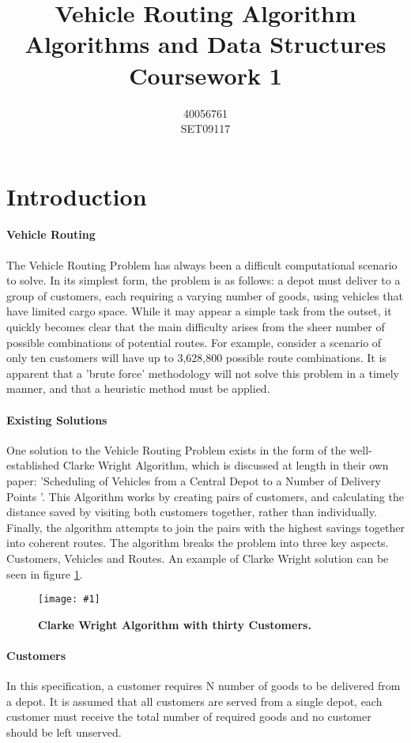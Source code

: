 \documentclass[conference]{acmsiggraph}
\title{Vehicle Routing Algorithm \\Algorithms and Data Structures \\ Coursework 1 }
\author{40056761 \\SET09117}
\newcommand{\figuremacroW}[4]{
	\begin{figure}[h] %
		\centering
		\texttt{[image: \#1]}
		\caption[#2]{\textbf{#2}  #3}
		\label{fig:#1}
	\end{figure}
}
\begin{document}
	\maketitle	
	\section{Introduction}
	
		\paragraph{Vehicle Routing}
		The Vehicle Routing Problem has always been a difficult computational scenario to solve. In its simplest form, the problem is as follows: a depot must deliver to a group of customers, each requiring a varying number of goods, using vehicles that have limited cargo space. While it may appear a simple task from the outset, it quickly becomes clear that the main difficulty arises from the sheer number of possible combinations of potential routes. For example, consider a scenario of only ten customers will have up to 3,628,800 possible route combinations. It is apparent that a 'brute force' methodology will not solve this problem in a timely manner, and that a heuristic method must be applied.
		
		\paragraph{Existing Solutions}
		One solution to the Vehicle Routing Problem exists in the form of the well-established Clarke Wright Algorithm, which is discussed at length in their own paper: 'Scheduling of Vehicles from a Central Depot to a Number of Delivery Points '\cite{CW}. This Algorithm works by creating pairs of customers, and calculating the distance saved by visiting both customers together, rather than individually. Finally, the algorithm attempts to join the pairs with the highest savings together into coherent routes. The algorithm breaks the problem into three key aspects. Customers, Vehicles and Routes. An example of Clarke Wright solution can be seen in figure \ref{fig:cw30}. 
		
		\figuremacroW
		{cw30}
		{Clarke Wright Algorithm with thirty Customers.}
		{}
		{0.75}
						
		\paragraph{Customers}
		In this specification, a customer requires N number of goods to be delivered from a depot. It is assumed that all customers are served from a single depot, each customer must receive the total number of required goods and no customer should be left unserved.
		
\end{document}

